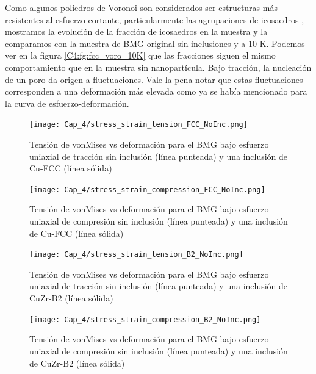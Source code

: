 Como algunos poliedros de Voronoi son considerados ser estructuras más resistentes al esfuerzo cortante, particularmente las agrupaciones de icosaedros \cite{cheng08}, mostramos la evolución de la fracción de icosaedros en la muestra y la comparamos con la muestra de BMG original sin inclusiones y a 10 K. Podemos ver en la figura \ref{C4:fg:fcc_voro_10K} que las fracciones siguen el mismo comportamiento que en la muestra sin nanopartícula. Bajo tracción, la nucleación de un poro da origen a fluctuaciones. Vale la pena notar que estas fluctuaciones corresponden a una deformación más elevada como ya se había mencionado para la curva de esfuerzo-deformación.

\begin{figure}[htp]
\centering
\texttt{[image: Cap\_4/stress\_strain\_tension\_FCC\_NoInc.png]}
\caption[vonMises vs deformación en tracción. Inclusión Cu-FCC]{Tensión de vonMises vs deformación para el BMG bajo esfuerzo uniaxial de tracción sin inclusión (línea punteada) y una inclusión de Cu-FCC (línea sólida)}
\label{C4:fg:fcc_vm_tension}
\end{figure}

\begin{figure}[htp]
\centering
\texttt{[image: Cap\_4/stress\_strain\_compression\_FCC\_NoInc.png]}
\caption[vonMises vs deformación en compresión. Inclusión de Cu-FCC]{Tensión de vonMises vs deformación para el BMG bajo esfuerzo uniaxial de compresión sin inclusión (línea punteada) y una inclusión de Cu-FCC (línea sólida)}
\label{C4:fg:fcc_vm_compression}
\end{figure}

\begin{figure}[htp]
\centering
\texttt{[image: Cap\_4/stress\_strain\_tension\_B2\_NoInc.png]}
\caption[vonMises vs deformación en tracción. Inclusión de CuZr-B2]{Tensión de vonMises vs deformación para el BMG bajo esfuerzo uniaxial de tracción sin inclusión (línea punteada) y una inclusión de CuZr-B2 (línea sólida)}
\label{C4:fg:b2_vm_tension}
\end{figure}

\begin{figure}[htp]
\centering
\texttt{[image: Cap\_4/stress\_strain\_compression\_B2\_NoInc.png]}
\caption[vonMises vs deformación en compresión. Inclusión de CuZr-B2]{Tensión de vonMises vs deformación para el BMG bajo esfuerzo uniaxial de compresión sin inclusión (línea punteada) y una inclusión de CuZr-B2 (línea sólida)}
\label{C4:fg:b2_vm_compression}
\end{figure}

